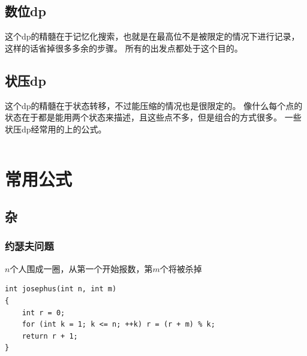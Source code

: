 \documentclass[a4paper,13.6pt]{article}
\begin{document}
\begin{CJK}{UTF8}{gbsn}
\subsection{数位dp}
这个dp的精髓在于记忆化搜索，也就是在最高位不是被限定的情况下进行记录，这样的话省掉很多多余的步骤。
所有的出发点都处于这个目的。
\subsection{状压dp}
这个dp的精髓在于状态转移，不过能压缩的情况也是很限定的。
像什么每个点的状态在于都是能用两个状态来描述，且这些点不多，但是组合的方式很多。
一些状压dp经常用的上的公式。
\inputminted{c++}{../scoure/dp/zhuangtai.cpp}
\section{常用公式}
\subsection{杂}
\subsubsection{约瑟夫问题}
$n$个人围成一圈，从第一个开始报数，第$m$个将被杀掉
\begin{lstlisting}
int josephus(int n, int m)
{
    int r = 0;
    for (int k = 1; k <= n; ++k) r = (r + m) % k;
    return r + 1;
}
\end{lstlisting}

\end{CJK}
\end{document}

